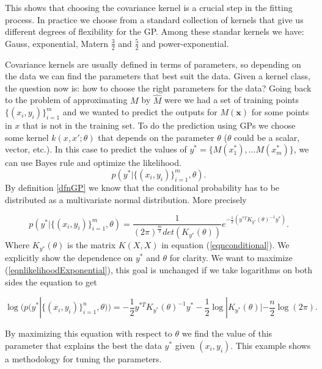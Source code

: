 \documentclass[12pt]{book}
\begin{document}
This shows that choosing the covariance kernel 
is a crucial step in the fitting process. In practice we choose from a standard collection of kernels
that give us different degrees of flexibility for the GP. Among these standar kernels we have: Gauss,
exponential, Matern $\frac{3}{2}$ and $\frac{5}{2}$ and power-exponential.

Covariance kernels are usually defined in terms of parameters, so depending on the data 
we can find the parameters that best suit the data. Given a kernel class, the question now is: how
to choose the right parameters for the data? Going back to the problem of approximating $M$
by $\hat{M}$ were  we had a 
set of training points $\{(x_{i},y_{i})\}_{i=1}^{m}$ and we wanted to predict the 
outputs for  $M(\textbf{x})$ for some points in $x$ that is not in the training set. To do the prediction
using GPs we choose some kernel  $k(x,x';\theta)$ that depends on the parameter $\theta$ 
($\theta$ could be a scalar, vector, etc.). In this case to predict the values of 
$y^{*}=\{M(x_{1}^{*}),\ldots M(x_{m}^{*})\}$, we can use
Bayes rule and optimize the likelihood.
\begin{equation*}
p(y^{*}|\{(x_{i},y_{i})\}_{i=1}^{m},\theta).
\end{equation*}
By definition \ref{dfnGP} we know that the conditional probability has to be distributed as
a multivariate normal distribution. More precisely

\begin{equation}\label{eqnlikelihoodExponential}
p(y^{*}|\{(x_{i},y_{i})\}_{i=1}^{m},\theta)=\frac{1}{(2\pi)^{\frac{m}{2}}det(K_{y^{*}}(\theta))}
e^{-\frac{1}{2}(y^{*T}K_{y^{*}}(\theta)^{-1}y^{*})}.
\end{equation}
Where $K_{y^{*}}(\theta)$ is the matrix $K(X,X)$ in equation (\ref{eqnconditional}). We explicitly
show the dependence on $y^{*}$ and $\theta$ for clarity. We want to maximize (\ref{eqnlikelihoodExponential}),
this goal is unchanged if we take logarithms on both sides  the equation to get


\begin{equation}\label{eqnloglikelihood}
\log(p(y^{*}|\{(x_{i},y_{i})\}_{i=1}^{n},\theta))=-\frac{1}{2}y^{*T}K_{y^{*}}(\theta)^{-1}y^{*}-
\frac{1}{2}\log|K_{y^{*}}(\theta)|-\frac{n}{2}\log(2\pi).
\end{equation}

By maximizing this equation with respect to $\theta$ we find the value of this parameter
that explains the best the data $y^{*}$ given $(x_{i},y_{i})$. This example shows a 
methodology for tuning the parameters. 
\newline
\end{document}
